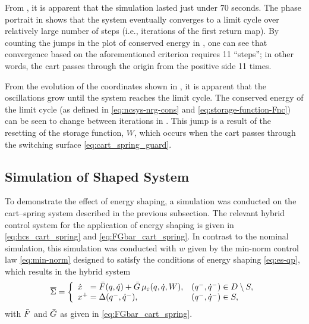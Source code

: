 From , it is apparent that the
simulation lasted just under $70$ seconds.
%
The phase portrait in  shows that the
system eventually converges to a limit cycle over relatively large number of
steps (i.e., iterations of the \Poincare{} first return map).
By counting the jumps in the plot of conserved energy in
, one can see that convergence based
on the aforementioned criterion requires 11 ``steps'';
%
in other words, the cart passes through the origin from the positive side 11
times.


From the evolution of the coordinates shown in
, it is apparent that the
oscillations grow until the system reaches the limit cycle.
%
The conserved energy of the limit cycle (as defined in
\eqref{eq:ncsys-nrg-cons} and \eqref{eq:storage-function-Fnc}) can be seen to change between iterations in .
%
This jump is a result of the resetting of the storage function, $W$, which
occurs when the cart passes through the switching surface
\eqref{eq:cart_spring_guard}.

\subsection{Simulation of Shaped System}

To demonstrate the effect of energy shaping, a simulation was conducted on the
cart--spring system described in the previous subsection.
%
The relevant hybrid control system for the application of energy shaping is
given in \eqref{eq:hcs_cart_spring} and \eqref{eq:FGbar_cart_spring}.
%
In contrast to the nominal simulation, this simulation was conducted with $w$
given by the min-norm control law \eqref{eq:min-norm} designed to satisfy the
conditions of energy shaping \eqref{eq:es-qp}, which results in the
hybrid system
\begin{align}
  \label{eq:hs_cart_spring_es}
  {\overline {\Sigma}} = \left\{
  \begin{array}{l l}
    {\dot {x}}\hphantom{^+} = {\bar {F}}(q, \dot{q}) + {\bar {G}} \, \mu_{\varepsilon}(q, \dot{q}, W), & (q^{-}, \dot{q}^{-}) \in D \setminus S,\\
    x^{+} = \Delta(q^{-}, \dot{q}^{-}), & (q^{-}, \dot{q}^{-}) \in S,
  \end{array}\right.
\end{align}
with ${\bar {F}}$ and ${\bar {G}}$ as given in \eqref{eq:FGbar_cart_spring}.

